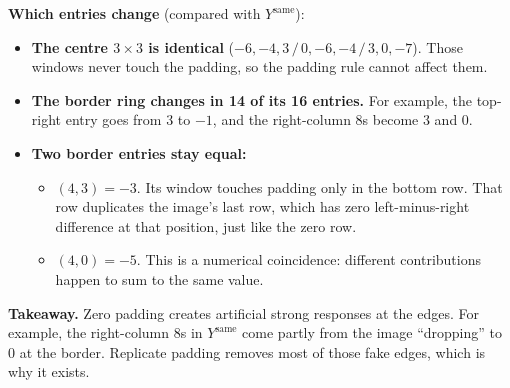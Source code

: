 \textbf{Which entries change} (compared with $Y^{\text{same}}$):
\begin{itemize}
  \item \textbf{The centre $3\times3$ is identical} ($-6,-4,3\,/\,0,-6,-4\,/\,3,0,-7$). Those windows never touch the padding, so the padding rule cannot affect them.
  \item \textbf{The border ring changes in 14 of its 16 entries.} For example, the top-right entry goes from 3 to $-1$, and the right-column 8s become 3 and 0.
  \item \textbf{Two border entries stay equal:}
  \begin{itemize}
    \item $(4,3)=-3$. Its window touches padding only in the bottom row. That row duplicates the image's last row, which has zero left-minus-right difference at that position, just like the zero row.
    \item $(4,0)=-5$. This is a numerical coincidence: different contributions happen to sum to the same value.
  \end{itemize}
\end{itemize}

\textbf{Takeaway.} Zero padding creates artificial strong responses at the edges. For example, the right-column 8s in $Y^{\text{same}}$ come partly from the image ``dropping'' to 0 at the border. Replicate padding removes most of those fake edges, which is why it exists.